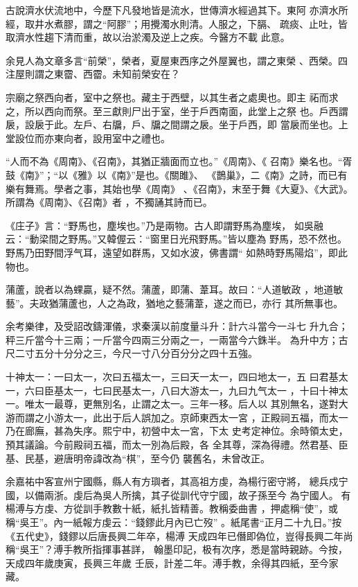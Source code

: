 \documentclass{ctexart}
\begin{document}
古說濟水伏流地中，今歷下凡發地皆是流水，世傳濟水經過其下。東阿 亦濟水所經，取井水煮膠，謂之``阿膠''；用攪濁水則清。人服之，下膈、 疏痰、止吐，皆取濟水性趨下清而重，故以治淤濁及逆上之疾。今醫方不載 此意。

余見人為文章多言``前榮''，榮者，夏屋東西序之外屋翼也，謂之東榮 、西榮。四注屋則謂之東霤、西霤。未知前榮安在？

宗廟之祭西向者，室中之祭也。藏主于西壁，以其生者之處奧也。即主 祏而求之，所以西向而祭。至三獻則尸出于室，坐于戶西南面，此堂上之祭 也。戶西謂扆，設扆于此。左戶、右牖，戶、牖之間謂之扆。坐于戶西，即 當扆而坐也。上堂設位而亦東向者，設用室中之禮也。

``人而不為《周南》、《召南》，其猶正牆面而立也。''《周南》、《 召南》樂名也。``胥鼓《南》''；``以《雅》以《南》''是也。《關雎》、 《鵲巢》，二《南》之詩，而已有樂有舞焉。學者之事，其始也學《周南》 、《召南》，末至于舞《大夏》、《大武》。所謂為《周南》、《召南》者 ，不獨誦其詩而已。

《庄子》言：``野馬也，塵埃也。''乃是兩物。古人即謂野馬為塵埃， 如吳融云：``動梁間之野馬。''又韓偓云：``窗里日光飛野馬。''皆以塵為 野馬，恐不然也。野馬乃田野間浮气耳，遠望如群馬，又如水波，佛書謂`` 如熱時野馬陽焰''，即此物也。

蒲蘆，說者以為蜾贏，疑不然。蒲蘆，即蒲、葦耳。故曰：``人道敏政 ，地道敏藝''。夫政猶蒲蘆也，人之為政，猶地之藝蒲葦，遂之而已，亦行 其所無事也。

余考樂律，及受詔改鑄渾儀，求秦漢以前度量斗升：計六斗當今一斗七 升九合；秤三斤當今十三兩；一斤當今四兩三分兩之一，一兩當今六銖半。 為升中方；古尺二寸五分十分分之三，今尺一寸八分百分分之四十五強。

十神太一：一曰太一，次曰五福太一，三曰天一太一，四曰地太一，五 曰君基太一，六曰臣基太一，七曰民基太一，八曰大游太一，九曰九气太一 ，十曰十神太一。唯太一最尊，更無別名，止謂之太一。三年一移。后人以 其別無名，遂對大游而謂之小游太一，此出于后人誤加之。京師東西太一宮 ，正殿祠五福，而太一乃在廊廡，甚為失序。熙宁中，初營中太一宮，下太 史考定神位。余時領太史，預其議論。今前殿祠五福，而太一別為后殿，各 全其尊，深為得禮。然君基、臣基、民基，避唐明帝諱改為``棋''，至今仍 襲舊名，未曾改正。

余嘉祐中客宣州宁國縣，縣人有方璵者，其高祖方虔，為楊行密守將， 總兵戍宁國，以備兩浙。虔后為吳人所擒，其子從訓代守宁國，故子孫至今 為宁國人。有楊溥与方虔、方從訓手教數十紙，紙扎皆精善。教稱委曲書 ，押處稱``使''，或稱``吳王''。內一紙報方虔云：``錢鏐此月內已亡歿'' 。紙尾書``正月二十九日。''按《五代史》，錢鏐以后唐長興二年卒，楊溥 天成四年已僭即偽位，豈得長興二年尚稱``吳王''？溥手教所指揮事甚詳， 翰墨印記，极有次序，悉是當時親跡。今按，天成四年歲庚寅，長興三年歲 壬辰，計差二年。溥手教，余得其四紙，至今家藏。
\end{document}
